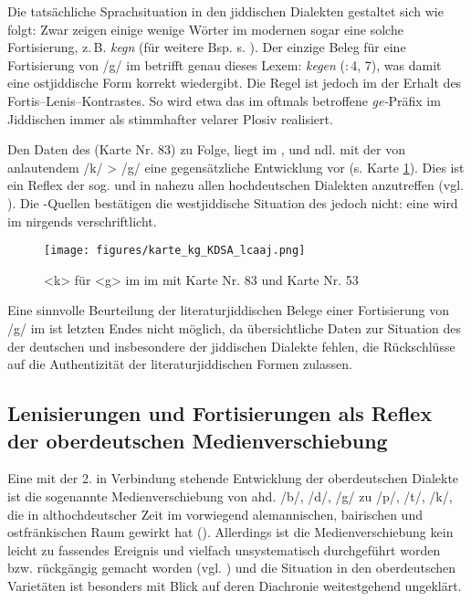 		
Die tatsächliche Sprachsituation in den jiddischen Dialekten gestaltet sich wie folgt: Zwar zeigen einige wenige Wörter im modernen  sogar eine solche Fortisierung, z.\,B.  \textit{kegn}  (für weitere Bsp. s. \cite[373]{Bin-Nun1973}). Der einzige Beleg für eine Fortisierung von /g/ im  betrifft genau dieses Lexem: \textit{kegen}  (:\,4, 7), was damit eine ostjiddische Form korrekt wiedergibt. Die Regel ist jedoch im  der Erhalt des Fortis–Lenis–Kontrastes.  So wird etwa das im  oftmals betroffene \textit{ge-}Präfix im Jiddischen immer als stimmhafter velarer Plosiv realisiert.  

Den Daten des  (Karte Nr. 83) zu Folge, liegt im ,  und ndl.  mit der  von anlautendem /k/ > /g/ eine gegensätzliche Entwicklung vor (s. Karte \ref{kartekgkdsalcaaj}). Dies ist ein Reflex der sog.  und in nahezu allen hochdeutschen Dialekten anzutreffen (vgl. \cite[332]{Schirmunski1962}). Die -Quellen bestätigen die westjiddische Situation des  jedoch nicht: eine  wird im  nirgends verschriftlicht.\\
		
		
		  \begin{figure}[h!]
		\centering
\texttt{[image: figures/karte\_kg\_KDSA\_lcaaj.png]}
		\caption{\label{kartekgkdsalcaaj} <k> für <g> im   im  mit  Karte Nr. 83 und  Karte Nr. 53}
		\end{figure}
\FloatBarrier


Eine sinnvolle Beurteilung der literaturjiddischen Belege einer Fortisierung von /g/ im  ist letzten Endes nicht möglich, da übersichtliche Daten zur Situation des  der deutschen und insbesondere der jiddischen Dialekte fehlen, die Rückschlüsse auf die Authentizität der literaturjiddischen Formen zulassen.\\
 
   \subsection{Lenisierungen und Fortisierungen als Reflex der oberdeutschen Medienverschiebung}
  Eine mit der 2.  in Verbindung stehende Entwicklung der oberdeutschen Dialekte ist die sogenannte Medienverschiebung von ahd. /b/, /d/, /g/ zu /p/, /t/, /k/, die in althochdeutscher Zeit im vorwiegend alemannischen, bairischen und ostfränkischen Raum gewirkt hat (\cite[131–133]{Szczepaniak2007}). Allerdings ist die Medienverschiebung kein leicht zu fassendes Ereignis und vielfach unsystematisch durchgeführt worden bzw. rückgängig gemacht worden (vgl. \cite[131–133]{Szczepaniak2007}) und die Situation in den oberdeutschen Varietäten ist besonders mit Blick auf deren Diachronie weitestgehend ungeklärt.
 
